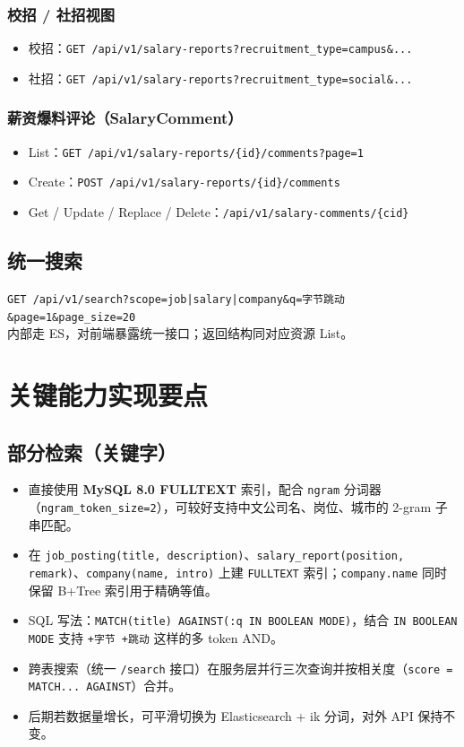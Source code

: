 \documentclass[11pt,a4paper]{ctexart}
\begin{document}
\subsubsection{校招 / 社招视图}
\begin{itemize}[leftmargin=2em]
    \item 校招：\texttt{GET /api/v1/salary-reports?recruitment\_type=campus\&...}
    \item 社招：\texttt{GET /api/v1/salary-reports?recruitment\_type=social\&...}
\end{itemize}

\subsubsection{薪资爆料评论（SalaryComment）}
\begin{itemize}[leftmargin=2em]
    \item List：\texttt{GET /api/v1/salary-reports/\{id\}/comments?page=1}
    \item Create：\texttt{POST /api/v1/salary-reports/\{id\}/comments}
    \item Get / Update / Replace / Delete：\texttt{/api/v1/salary-comments/\{cid\}}
\end{itemize}

\subsection{统一搜索}
\texttt{GET /api/v1/search?scope=job|salary|company\&q=字节跳动\&page=1\&page\_size=20}\\
内部走 ES，对前端暴露统一接口；返回结构同对应资源 List。

\section{关键能力实现要点}

\subsection{部分检索（关键字）}
\begin{itemize}[leftmargin=2em]
    \item 直接使用 \textbf{MySQL 8.0 FULLTEXT} 索引，配合 \texttt{ngram} 分词器（\texttt{ngram\_token\_size=2}），可较好支持中文公司名、岗位、城市的 2-gram 子串匹配。
    \item 在 \texttt{job\_posting(title, description)}、\texttt{salary\_report(position, remark)}、\texttt{company(name, intro)} 上建 \texttt{FULLTEXT} 索引；\texttt{company.name} 同时保留 B+Tree 索引用于精确等值。
    \item SQL 写法：\texttt{MATCH(title) AGAINST(:q IN BOOLEAN MODE)}，结合 \texttt{IN BOOLEAN MODE} 支持 \texttt{+字节 +跳动} 这样的多 token AND。
    \item 跨表搜索（统一 \texttt{/search} 接口）在服务层并行三次查询并按相关度（\texttt{score = MATCH... AGAINST}）合并。
    \item 后期若数据量增长，可平滑切换为 Elasticsearch + ik 分词，对外 API 保持不变。
\end{itemize}
\end{document}
